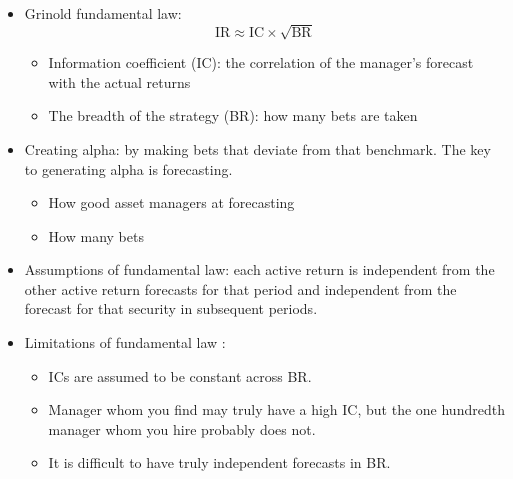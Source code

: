 \begin{itemize}
\begin{itemize}
    \end{itemize}
\item Grinold fundamental law:
\[
\text{IR} \approx \text{IC} \times \sqrt{\text{BR}}
\]
    \begin{itemize}
    \item Information coefficient (IC): the correlation of the manager's forecast with the actual returns
    \item The breadth of the strategy (BR): how many bets are taken
    \end{itemize}
\item Creating alpha: by making bets that deviate from that benchmark. The key to generating alpha is forecasting.
    \begin{itemize}
    \item How good asset managers at forecasting
    \item  How many bets
    \end{itemize}
\item Assumptions of fundamental law: each active return is independent from the other active return forecasts for that period and independent from the forecast for that security in subsequent periods.

\item Limitations of fundamental law :
    \begin{itemize}
    \item ICs are assumed to be constant across BR.
    \item Manager whom you find may truly have a high IC, but the one hundredth manager whom you hire probably does not.
    \item It is difficult to have truly independent forecasts in BR.
    \end{itemize}
\end{itemize}



